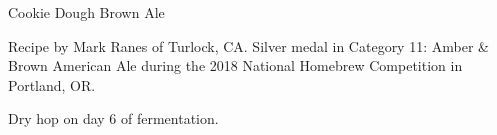 \begin{recipe}{Cookie Dough Brown Ale}

\begin{aboutblock}
Recipe by Mark Ranes of Turlock, CA. Silver medal in Category 11: Amber \& Brown
American Ale during the 2018 National Homebrew Competition in Portland, OR.
\sourceaha
\end{aboutblock}


\begin{methodandtiming}

\begin{mashsteps}
\end{mashsteps}

\begin{fermentationsteps}
\end{fermentationsteps}

\begin{directions}
Dry hop on day 6 of fermentation.
\end{directions}

\end{methodandtiming}

\recipebreak

\begin{ingredientsblock}

\begin{malts}
\end{malts}

\begin{hops}
\end{hops}


\end{ingredientsblock}

\end{recipe}

